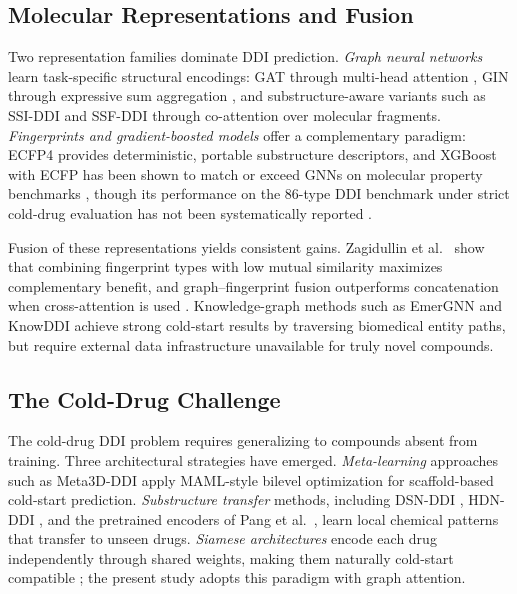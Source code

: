 \documentclass[11pt,a4paper,twocolumn]{article}
\begin{document}
\subsection{Molecular Representations and Fusion}
\label{sec:molrep}
Two representation families dominate DDI prediction.
\textit{Graph neural networks} learn task-specific structural encodings: GAT
through multi-head attention \cite{velickovic2018gat}, GIN through expressive sum
aggregation \cite{xu2019gin}, and substructure-aware variants such as SSI-DDI
\cite{nyamabo2021ssiddi} and SSF-DDI \cite{ssfddi2024} through co-attention over
molecular fragments.
\textit{Fingerprints and gradient-boosted models} offer a complementary paradigm:
ECFP4 \cite{rogers2010ecfp} provides deterministic, portable substructure
descriptors, and XGBoost with ECFP has been shown to match or exceed GNNs on
molecular property benchmarks
\cite{boldini2023xgboost, jiang2021gnnvsdescriptor}, though its performance on
the 86-type DDI benchmark under strict cold-drug evaluation has not been
systematically reported \cite{shtar2019xgboost, tran2021xgboost}.

Fusion of these representations yields consistent gains.
Zagidullin et al.\ \cite{zagidullin2021fingerprints} show that combining
fingerprint types with low mutual similarity maximizes complementary benefit,
and graph--fingerprint fusion outperforms concatenation when cross-attention is
used \cite{mlfgnn2025}.
Knowledge-graph methods such as EmerGNN \cite{zhang2023emergnn} and KnowDDI
\cite{wang2024knowddi} achieve strong cold-start results by traversing biomedical
entity paths, but require external data infrastructure unavailable for truly novel
compounds.

\subsection{The Cold-Drug Challenge}
\label{sec:coldstart}
The cold-drug DDI problem requires generalizing to compounds absent from training.
Three architectural strategies have emerged.
\textit{Meta-learning} approaches such as Meta3D-DDI \cite{lv2023meta3d} apply
MAML-style bilevel optimization for scaffold-based cold-start prediction.
\textit{Substructure transfer} methods, including DSN-DDI \cite{dsnddi2023},
HDN-DDI \cite{hdnddi2025}, and the pretrained encoders of Pang et al.\ \cite{pang2023pretraining}, learn local chemical patterns that transfer to unseen
drugs.
\textit{Siamese architectures} encode each drug independently through shared
weights, making them naturally cold-start compatible
\cite{schwarz2021attentionddi, cnnsiam2023}; the present study adopts this
paradigm with graph attention.
\end{document}
